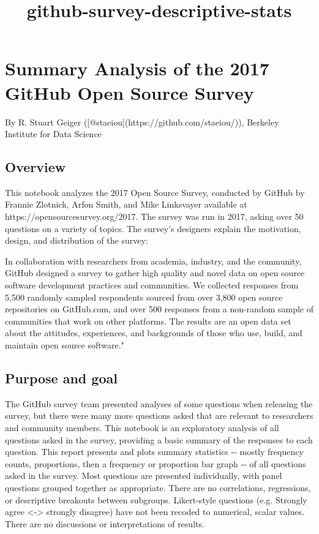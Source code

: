\documentclass[11pt]{article}
\title{github-survey-descriptive-stats}
\begin{document}
    
    
    \maketitle
    
    

    
    \section{Summary Analysis of the 2017 GitHub Open Source
Survey}\label{summary-analysis-of-the-2017-github-open-source-survey}

By R. Stuart Geiger ({[}@staeiou{]}(https://github.com/staeiou/)),
Berkeley Institute for Data Science

\subsection{Overview}\label{overview}

This notebook analyzes the 2017 Open Source Survey, conducted by GitHub
by Frannie Zlotnick, Arfon Smith, and Mike Linksvayer \cite{Github2017}
available at https://opensourcesurvey.org/2017. The survey was run in
2017, asking over 50 questions on a variety of topics. The survey's
designers explain the motivation, design, and distribution of the
survey:

In collaboration with researchers from academia, industry, and the
community, GitHub designed a survey to gather high quality and novel
data on open source software development practices and communities. We
collected responses from 5,500 randomly sampled respondents sourced from
over 3,800 open source repositories on GitHub.com, and over 500
responses from a non-random sample of communities that work on other
platforms. The results are an open data set about the attitudes,
experiences, and backgrounds of those who use, build, and maintain open
source software."

\subsection{Purpose and goal}\label{purpose-and-goal}

The GitHub survey team presented analyses of some questions when
releasing the survey, but there were many more questions asked that are
relevant to researchers and community members. This notebook is an
exploratory analysis of all questions asked in the survey, providing a
basic summary of the responses to each question. This report presents
and plots summary statistics -\/- mostly frequency counts, proportions,
then a frequency or proportion bar graph -\/- of all questions asked in
the survey. Most questions are presented individually, with panel
questions grouped together as appropriate. There are no correlations,
regressions, or descriptive breakouts between subgroups. Likert-style
questions (e.g. Strongly agree \textless{}-\textgreater{} strongly
disagree) have not been recoded to numerical, scalar values. There are
no discussions or interpretations of results.
\end{document}
